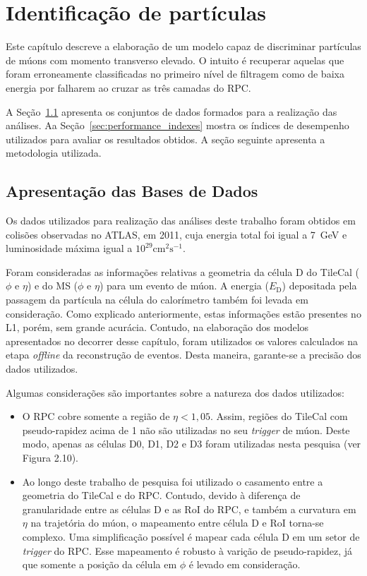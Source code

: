 \chapter{Identificação de partículas}

Este capítulo descreve a elaboração de um modelo capaz de discriminar partículas
de múons com momento transverso elevado. O intuito é recuperar aquelas que
foram erroneamente classificadas no primeiro nível de filtragem como de baixa
energia por falharem ao cruzar as três camadas do RPC. 

A Seção~\ref{sec:data-section} apresenta os conjuntos de dados formados para a
realização das análises. Aa Seção~\ref{sec:performance_indexes} mostra os
índices de desempenho utilizados para avaliar os resultados obtidos. A seção
seguinte apresenta a metodologia utilizada.

\section{Apresentação das Bases de Dados}
\label{sec:data-section}

Os dados utilizados para realização das análises deste trabalho foram obtidos em
colisões observadas no ATLAS, em 2011, cuja energia total foi igual a 7~GeV e
luminosidade máxima igual a $10^{29}\text{cm}^2\text{s}^{-1}$.

Foram consideradas as informações relativas a geometria da célula D do TileCal
($\phi$ e $\eta$) e do MS ($\phi$ e $\eta$) para um evento de múon.  A energia
($E_\text{D}$) depositada pela passagem da partícula na célula do calorímetro também
foi levada em consideração. Como explicado anteriormente, estas informações
estão presentes no L1, porém, sem grande acurácia.  Contudo, na elaboração dos
modelos apresentados no decorrer desse capítulo, foram utilizados os valores
calculados na etapa \emph{offline} da reconstrução de eventos. Desta maneira,
garante-se a precisão dos dados utilizados.

Algumas considerações são importantes sobre a natureza dos dados utilizados:

\begin{itemize}

    \item O RPC cobre somente a região de $\eta < 1,05$. Assim, regiões do
    TileCal com pseudo-rapidez acima de 1 não são utilizadas no seu
    \emph{trigger} de múon.  Deste modo, apenas as células D0, D1, D2 e D3 foram
    utilizadas nesta pesquisa (ver Figura 2.10).

    \item Ao longo deste trabalho de pesquisa foi utilizado o casamento entre a
    geometria do TileCal e do RPC. Contudo, devido à diferença de granularidade
    entre as células D e as RoI do RPC, e também a curvatura em $\eta$ na
    trajetória do múon, o mapeamento entre célula D e RoI torna-se complexo. Uma
    simplificação possível é mapear cada célula D em um setor de \emph{trigger}
    do RPC. Esse mapeamento é robusto à varição de pseudo-rapidez, já que
    somente a posição da célula em $\phi$ é levado em consideração.

\end{itemize}

